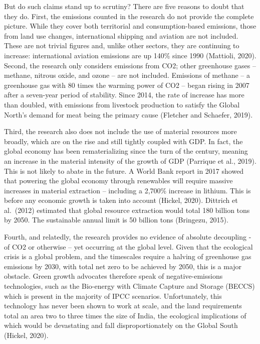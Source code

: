 \documentclass[
]{book}
\begin{document}
But do such claims stand up to scrutiny? There are five reasons to doubt that they do. First, the emissions counted in the research do not provide the complete picture. While they cover both territorial and consumption-based emissions, those from land use changes, international shipping and aviation are not included. These are not trivial figures and, unlike other sectors, they are continuing to increase: international aviation emissions are up 140\% since 1990 (Mattioli, 2020). Second, the research only considers emissions from CO2; other greenhouse gases -- methane, nitrous oxide, and ozone -- are not included. Emissions of methane -- a greenhouse gas with 80 times the warming power of CO2 -- began rising in 2007 after a seven-year period of stability. Since 2014, the rate of increase has more than doubled, with emissions from livestock production to satisfy the Global North's demand for meat being the primary cause (Fletcher and Schaefer, 2019).

Third, the research also does not include the use of material resources more broadly, which are on the rise and still tightly coupled with GDP. In fact, the global economy has been rematerializing since the turn of the century, meaning an increase in the material intensity of the growth of GDP (Parrique et al., 2019). This is not likely to abate in the future. A World Bank report in 2017 showed that powering the global economy through renewables will require massive increases in material extraction -- including a 2,700\% increase in lithium. This is before any economic growth is taken into account (Hickel, 2020). Dittrich et al.~(2012) estimated that global resource extraction would total 180 billion tons by 2050. The sustainable annual limit is 50 billion tons (Bringezu, 2015).

Fourth, and relatedly, the research provides no evidence of absolute decoupling - of CO2 or otherwise -- yet occurring at the global level. Given that the ecological crisis is a global problem, and the timescales require a halving of greenhouse gas emissions by 2030, with total net zero to be achieved by 2050, this is a major obstacle. Green growth advocates therefore speak of negative-emissions technologies, such as the Bio-energy with Climate Capture and Storage (BECCS) which is present in the majority of IPCC scenarios. Unfortunately, this technology has never been shown to work at scale, and the land requirements total an area two to three times the size of India, the ecological implications of which would be devastating and fall disproportionately on the Global South (Hickel, 2020).
\end{document}
